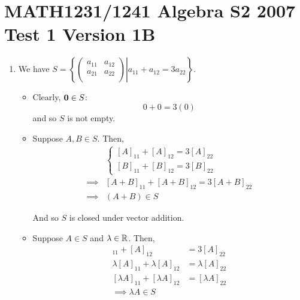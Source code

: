 \section*{MATH1231/1241 Algebra S2 2007 Test 1 Version 1B}
\begin{enumerate}
    \item
        We have $S = \left\{ \left. \begin{pmatrix}
            a_{11} & a_{12} \\
            a_{21} & a_{22} \\
        \end{pmatrix} \right| a_{11} + a_{12} = 3a_{22} \right\}$.

        \begin{itemize}
            \item
                Clearly, $\mathbf{0} \in S$:
                $$0 + 0 = 3(0)$$
                and so $S$ is not empty.

            \item
                Suppose $A, B \in S$. Then,
                \begin{align*}
                    &\left\{\begin{matrix}
                        [A]_{11} + [A]_{12} = 3[A]_{22} \\
                        [B]_{11} + [B]_{12} = 3[B]_{22}
                    \end{matrix}\right. \\
                    \implies
                    &[A+B]_{11} + [A+B]_{12} = 3[A+B]_{22} \\
                    \implies
                    &(A + B) \in S
                \end{align*}

                And so $S$ is closed under vector addition.

            \item
                Suppose $A \in S$ and $\lambda \in \mathbb{R}$. Then,
                \begin{align*}
                    [A]_{11} + [A]_{12} &= 3[A]_{22} \\
                    \lambda[A]_{11} + \lambda[A]_{12} &= \lambda[A]_{22} \\
                    [\lambda A]_{11} +  [\lambda A]_{12} &=  [\lambda A]_{22} \\
                    \implies
                    \lambda A \in S
                \end{align*}


\end{itemize}
\end{enumerate}

